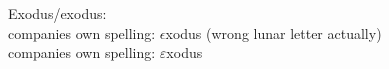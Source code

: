 \documentclass[
    fontsize=12pt,
    oneside,
    a4paper,
    titlepage,
    numbers=noenddot,
]{scrbook}
\begin{document}
\noindent
Exodus/exodus:\\
companies own spelling: $\epsilon$xodus\cite{exodusHomepageLunar} (wrong lunar letter actually)\\
companies own spelling: $\varepsilon$xodus\cite{exodusHomepage}

\printbibliography
\end{document}
